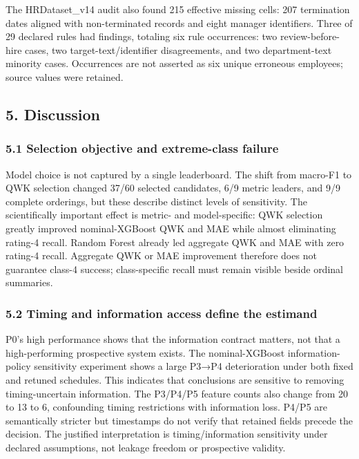 \documentclass[
  a4paper,
  review]{elsarticle}
\begin{document}
The HRDataset\_v14 audit also found 215 effective missing cells: 207
termination dates aligned with non-terminated records and eight manager
identifiers. Three of 29 declared rules had findings, totaling six rule
occurrences: two review-before-hire cases, two target-text/identifier
disagreements, and two department-text minority cases. Occurrences are
not asserted as six unique erroneous employees; source values were
retained.

\subsection{5. Discussion}\label{discussion}

\subsubsection{5.1 Selection objective and extreme-class
failure}\label{selection-objective-and-extreme-class-failure-1}

Model choice is not captured by a single leaderboard. The shift from
macro-F1 to QWK selection changed 37/60 selected candidates, 6/9 metric
leaders, and 9/9 complete orderings, but these describe distinct levels
of sensitivity. The scientifically important effect is metric- and
model-specific: QWK selection greatly improved nominal-XGBoost QWK and
MAE while almost eliminating rating-4 recall. Random Forest already led
aggregate QWK and MAE with zero rating-4 recall. Aggregate QWK or MAE
improvement therefore does not guarantee class-4 success; class-specific
recall must remain visible beside ordinal summaries.

\subsubsection{5.2 Timing and information access define the
estimand}\label{timing-and-information-access-define-the-estimand}

P0's high performance shows that the information contract matters, not
that a high-performing prospective system exists. The nominal-XGBoost
information-policy sensitivity experiment shows a large P3→P4
deterioration under both fixed and retuned schedules. This indicates
that conclusions are sensitive to removing timing-uncertain information.
The P3/P4/P5 feature counts also change from 20 to 13 to 6, confounding
timing restrictions with information loss. P4/P5 are semantically
stricter but timestamps do not verify that retained fields precede the
decision. The justified interpretation is timing/information sensitivity
under declared assumptions, not leakage freedom or prospective validity.
\end{document}
